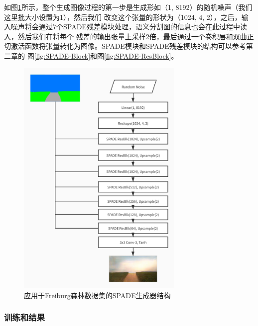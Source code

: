 \documentclass[supercite]{HustGraduPaper}
\theoremstyle{definition}
\begin{document}
如图\ref{fig:SPADE-imp-generator}所示，整个生成图像过程的第一步是生成形如（1, 8192）的随机噪声（我们这里批大小设置为1），然后我们
改变这个张量的形状为（1024, 4, 2），之后，输入噪声将会通过7个SPADE残差模块处理，语义分割图的信息也会在此过程中读入，然后我们在将每个
残差的输出张量上采样2倍，最后通过一个卷积层和双曲正切激活函数将张量转化为图像。SPADE模块和SPADE残差模块的结构可以参考第二章的
图\ref{fig:SPADE-Block}和图\ref{fig:SPADE-ResBlock}。
\begin{figure}
  \begin{center}
  \includegraphics[width=8cm]{images/SPADE-imp-generator}
  \end{center}
  \caption{应用于Freiburg森林数据集的SPADE生成器结构}
  \label{fig:SPADE-imp-generator}
\end{figure}

\subsubsection{训练和结果}
\end{document}
